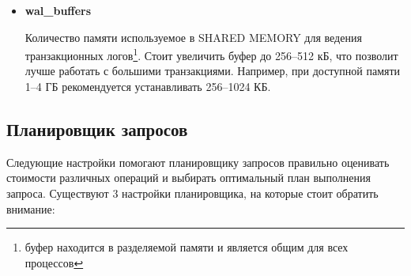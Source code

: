 \begin{itemize}
\item \textbf{wal\_buffers}

Количество памяти используемое в SHARED MEMORY для ведения транзакционных логов\footnote{буфер находится в
разделяемой памяти и является общим для всех процессов}.
Стоит увеличить буфер до 256--512 кБ, что позволит лучше работать с большими транзакциями.
Например, при доступной памяти 1--4 ГБ рекомендуется устанавливать 256--1024 КБ.

\end{itemize}


\subsection{Планировщик запросов}
Следующие настройки помогают планировщику запросов правильно оценивать стоимости различных
операций и выбирать оптимальный план выполнения запроса. Существуют 3 настройки планировщика,
на которые стоит обратить внимание:
